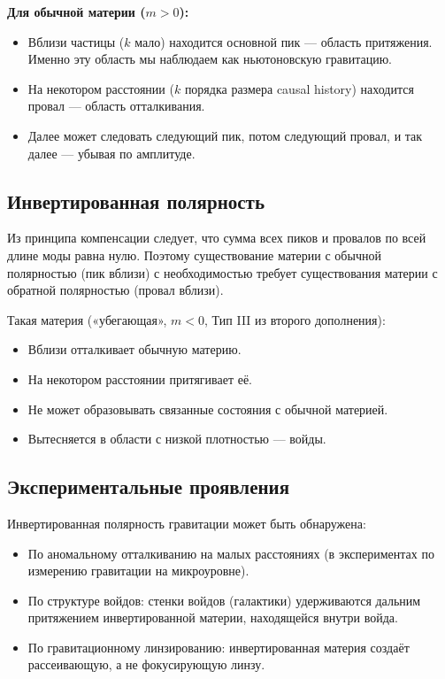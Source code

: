 \documentclass[12pt,a4paper]{article}
\begin{document}
\textbf{Для обычной материи ($m > 0$):}
\begin{itemize}
    \item Вблизи частицы ($k$ мало) находится основной пик --- область притяжения. Именно эту область мы наблюдаем как ньютоновскую гравитацию.
    \item На некотором расстоянии ($k$ порядка размера causal history) находится провал --- область отталкивания.
    \item Далее может следовать следующий пик, потом следующий провал, и так далее --- убывая по амплитуде.
\end{itemize}

\subsection{Инвертированная полярность}
Из принципа компенсации следует, что сумма всех пиков и провалов по всей длине моды равна нулю. Поэтому существование материи с обычной полярностью (пик вблизи) с необходимостью требует существования материи с обратной полярностью (провал вблизи).

Такая материя («убегающая», $m < 0$, Тип III из второго дополнения):
\begin{itemize}
    \item Вблизи отталкивает обычную материю.
    \item На некотором расстоянии притягивает её.
    \item Не может образовывать связанные состояния с обычной материей.
    \item Вытесняется в области с низкой плотностью --- войды.
\end{itemize}

\subsection{Экспериментальные проявления}
Инвертированная полярность гравитации может быть обнаружена:
\begin{itemize}
    \item По аномальному отталкиванию на малых расстояниях (в экспериментах по измерению гравитации на микроуровне).
    \item По структуре войдов: стенки войдов (галактики) удерживаются дальним притяжением инвертированной материи, находящейся внутри войда.
    \item По гравитационному линзированию: инвертированная материя создаёт рассеивающую, а не фокусирующую линзу.
\end{itemize}
\end{document}
